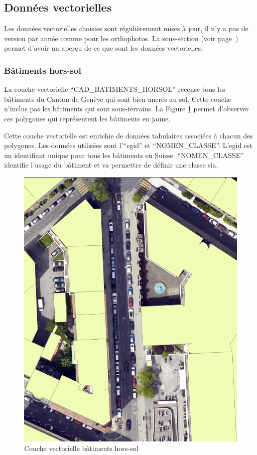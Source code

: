 \newpage
\subsection{Données vectorielles}
Les données vectorielles choisies sont régulièrement mises à jour, il n'y a pas de version par année comme pour les orthophotos. La sous-section \textit{} (voir page~\pageref{subsec:annexe_donnees_vectorielles}) permet d'avoir un aperçu de ce que sont les données vectorielles.
\subsubsection{Bâtiments hors-sol}
La couche vectorielle ``CAD\_BATIMENTS\_HORSOL'' \cite{sitg_batiments_nodate} recense tous les bâtiments du Canton de Genève qui sont bien ancrés au sol. Cette couche n'inclus pas les bâtiments qui sont sous-terrains. La Figure \ref{fig:ch3_dataset_methodo_02_batiment_horsol} permet d'observer ces polygones qui représentent les bâtiments en jaune.

Cette couche vectorielle est enrichie de données tabulaires associées à chacun des polygones. Les données utilisées sont l'``\gls{egid}'' et ``NOMEN\_CLASSE''. L'\gls{egid} est un identifiant unique pour tous les bâtiments en Suisse. ``NOMEN\_CLASSE'' identifie l'usage du bâtiment et va permettre de définir une classe \gls{sia}.

\begin{figure}[H]
    \centering
    \includegraphics[width=1\linewidth]{02-main//figures/ch3/ch3_dataset_methodo_02_batiment_horsol.png}
    \caption{Couche vectorielle bâtiments hors-sol}
    \label{fig:ch3_dataset_methodo_02_batiment_horsol}
\end{figure}


